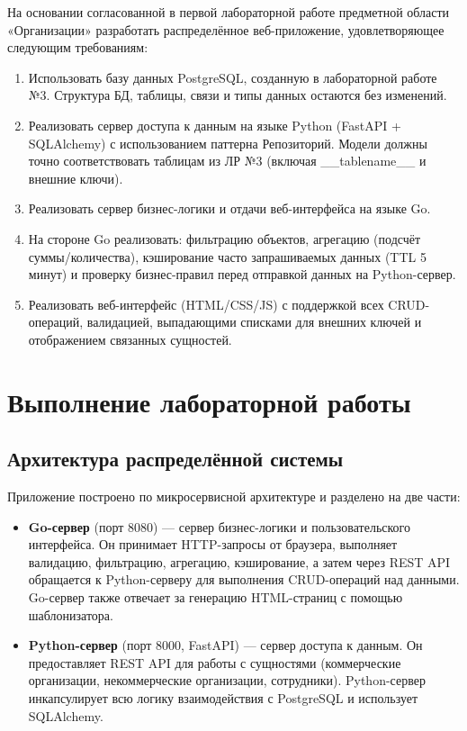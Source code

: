 \documentclass[oneside,a4paper,14pt]{extarticle}
\begin{document}
На основании согласованной в первой лабораторной работе предметной области «Организации» разработать распределённое веб-приложение, удовлетворяющее следующим требованиям:
\begin{enumerate}
    \item Использовать базу данных PostgreSQL, созданную в лабораторной работе №3. Структура БД, таблицы, связи и типы данных остаются без изменений.
    \item Реализовать сервер доступа к данным на языке Python (FastAPI + SQLAlchemy) с использованием паттерна Репозиторий. Модели должны точно соответствовать таблицам из ЛР №3 (включая \_\_tablename\_\_ и внешние ключи).
    \item Реализовать сервер бизнес-логики и отдачи веб-интерфейса на языке Go.
    \item На стороне Go реализовать: фильтрацию объектов, агрегацию (подсчёт суммы/количества), кэширование часто запрашиваемых данных (TTL 5 минут) и проверку бизнес-правил перед отправкой данных на Python-сервер.
    \item Реализовать веб-интерфейс (HTML/CSS/JS) с поддержкой всех CRUD-операций, валидацией, выпадающими списками для внешних ключей и отображением связанных сущностей.
\end{enumerate}

\newpage

\section*{Выполнение лабораторной работы}

\subsection*{Архитектура распределённой системы}

Приложение построено по микросервисной архитектуре и разделено на две части:
\begin{itemize}
    \item \textbf{Go-сервер} (порт 8080) — сервер бизнес-логики и пользовательского интерфейса. Он принимает HTTP-запросы от браузера, выполняет валидацию, фильтрацию, агрегацию, кэширование, а затем через REST API обращается к Python-серверу для выполнения CRUD-операций над данными. Go-сервер также отвечает за генерацию HTML-страниц с помощью шаблонизатора.
    \item \textbf{Python-сервер} (порт 8000, FastAPI) — сервер доступа к данным. Он предоставляет REST API для работы с сущностями (коммерческие организации, некоммерческие организации, сотрудники). Python-сервер инкапсулирует всю логику взаимодействия с PostgreSQL и использует SQLAlchemy.
\end{itemize}
\end{document}
